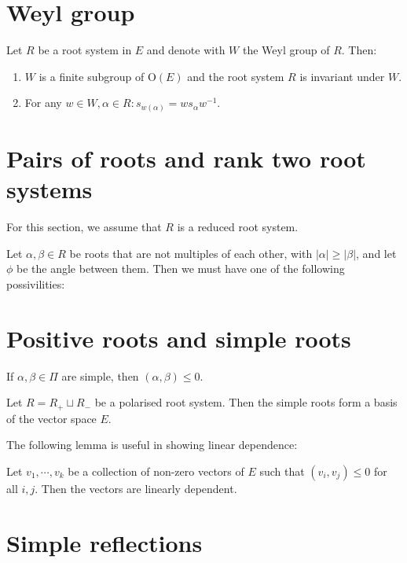 \documentclass{report}
\begin{document}
\section{Weyl group}
\begin{lemma}
    Let $R$ be a root system in $E$ and denote with $W$ the Weyl group of $R$. Then:
    \begin{enumerate}[label = (\roman*)]
        \item $W$ is a finite subgroup of $\mathrm{O}(E)$ and the root system $R$ is invariant under $W$.
        \item For any $w\in W, \alpha \in R: s_{w(\alpha)}=w s_\alpha w^{-1}$.
    \end{enumerate}
\end{lemma}

\section{Pairs of roots and rank two root systems}
For this section, we assume that $R$ is a reduced root system.
\begin{proposition}
    Let $\alpha, \beta \in R$ be roots that are not multiples of each other, with $|\alpha| \geq |\beta|$, and let $\phi$ be the angle between them.
    Then we must have one of the following possivilities:
\end{proposition}

\section{Positive roots and simple roots}
\begin{lemma}
    If $\alpha, \beta \in \Pi$ are simple, then $(\alpha, \beta) \leq 0$.
\end{lemma}
\begin{proposition}
    Let $R = R_+ \sqcup R_-$ be a polarised root system.
    Then the simple roots form a basis of the vector space $E$. 
\end{proposition}
The following lemma is useful in showing linear dependence:
\begin{lemma}
    Let $v_1, \cdots, v_k$ be a collection of non-zero vectors of $E$ such that $(v_i, v_j) \leq 0$ for all $i,j$.
    Then the vectors are linearly dependent.
\end{lemma}


\section{Simple reflections}
\end{document}
